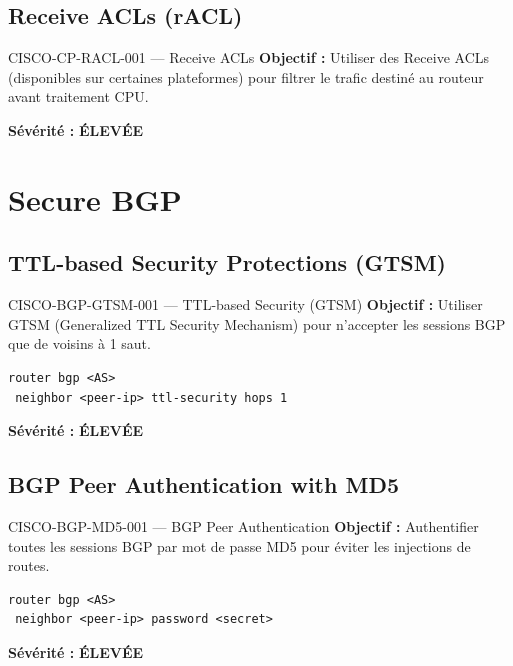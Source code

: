 \documentclass[12pt, a4paper]{report}
\begin{document}
\subsection{Receive ACLs (rACL)}

\begin{rulebox}{CISCO-CP-RACL-001 — Receive ACLs}
  \textbf{Objectif :} Utiliser des Receive ACLs (disponibles sur certaines plateformes) pour filtrer le trafic destiné au routeur avant traitement CPU.

  \textbf{Sévérité :} \textcolor{accentOrange}{\textbf{ÉLEVÉE}}
\end{rulebox}

\section{Secure BGP}

\subsection{TTL-based Security Protections (GTSM)}

\begin{rulebox}{CISCO-BGP-GTSM-001 — TTL-based Security (GTSM)}
  \textbf{Objectif :} Utiliser GTSM (Generalized TTL Security Mechanism) pour n'accepter les sessions BGP que de voisins à 1 saut.

  \begin{lstlisting}
router bgp <AS>
 neighbor <peer-ip> ttl-security hops 1
  \end{lstlisting}

  \textbf{Sévérité :} \textcolor{accentOrange}{\textbf{ÉLEVÉE}}
\end{rulebox}

\subsection{BGP Peer Authentication with MD5}

\begin{rulebox}{CISCO-BGP-MD5-001 — BGP Peer Authentication}
  \textbf{Objectif :} Authentifier toutes les sessions BGP par mot de passe MD5 pour éviter les injections de routes.

  \begin{lstlisting}
router bgp <AS>
 neighbor <peer-ip> password <secret>
  \end{lstlisting}

  \textbf{Sévérité :} \textcolor{accentOrange}{\textbf{ÉLEVÉE}}
\end{rulebox}
\end{document}
